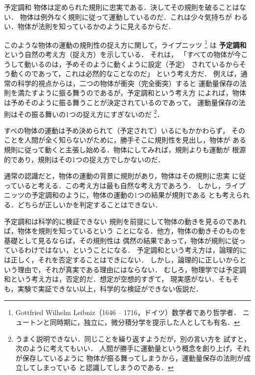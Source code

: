             \begin{mysmallsec}{予定調和}
            物体は定められた規則に忠実である．決してその規則を破ることはない．
            物体は例外なく規則に従って運動しているのだ．これは少々気持ちが
            わるい．物体が法則を知っているかのように見えるからだ．

            このような物体の運動の規則性の捉え方に関して，ライプニッツ
                \footnote{
                    Gottfried Wilhelm Leibniz（1646 -- 1716，ドイツ）数学者であり哲学者．
                    ニュートンと同時期に，独立に，微分積分学を提示した人としても有名．
                }
            は \textbf{予定調和} という自然の考え方（捉え方）を示している．
            それは，
            「すべての物体が今こうして動いるのは，予めそのように動くように設定（予定）
            されているからそう動くのであって，これは必然的なことなのだ」
            という考え方だ．
            例えば，通常の科学的視点からは，二つの物体が衝突（完全衝突）すると
            運動量保存の法則を満たすように振る舞うのであるが，予定調和という考え方
            によれば，物体は予めそのように振る舞うことが決定されているのであって，
            運動量保存の法則はその振る舞いの1つの捉え方にすぎないのだ
                \footnote{
                    うまく説明できない．同じことを繰り返すようだが，別の言い方を
                    試すと，次のように考えてもいい．
                    人間が勝手に運動量という概念を創り上げ，それが保存しているように
                    物体が振る舞ってしまうから，運動量保存の法則が成立してしまっている
                    と認識してしまうのである．
                }．

            すべの物体の運動は予め決められて（予定されて）いるにもかかわらず，
            そのことを人間が全く知らないがために，勝手そこに規則性を見出し，物体が
            ある規則に従って動くと主張し始める．物体にしてみれば，規則よりも運動が
            根源的であり，規則はその1つの捉え方でしかないのだ．

            通常の認識だと，物体の運動の背景に規則があり，物体はその規則に忠実
            に従っていると考える．この考え方は最も自然な考え方であろう．
            しかし，ライプニッツの予定調和のように，物体の運動の1つの結果が規則である
            とも考えられる．どちらが正しいかを判定することはできない．
            \end{mysmallsec}

            \begin{mysmallsec}{予定調和は科学的に検証できない}
            規則を前提にして物体の動きを見るのであれば，物体を規則を知っているという
            ことになる．他方，物体の動きそのものを基礎として見るならば，その規則性は
            偶然の結果であって，物体が規則に従っているわけではない，ということになる．
            予定調和という考え方は，論理的には正しく，それを否定することはできにない．
            しかし，論理的に正しいからという理由で，それが真実である理由にはならない．
            むしろ，物理学では予定調和という考え方は，否定的だ．想定が空想的すぎて，
            現実感がない．そもそも，実験で実証できない以上，科学的な検証ができない仮説だ．
            \end{mysmallsec}

